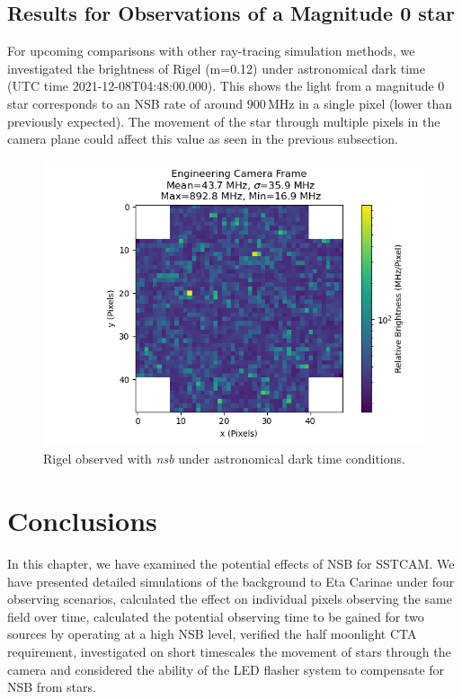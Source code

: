 \subsection{Results for Observations of a Magnitude 0 star}
For upcoming comparisons with other ray-tracing simulation methods, we investigated the brightness of Rigel (m=0.12) under astronomical dark time (UTC time 2021-12-08T04:48:00.000). This shows the light from a magnitude 0 star corresponds to an NSB rate of around $\mathrm{900\,MHz}$ in a single pixel (lower than previously expected). The movement of the star through multiple pixels in the camera plane could affect this value as seen in the previous subsection.
\begin{figure}[t!]
\begin{centering}
\includegraphics[width=0.7\columnwidth]{./figures/Hz_pixel_Rigel.png}
\caption{Rigel observed with \textit{nsb} under astronomical dark time conditions.}
\label{fig:rigel}
\end{centering}
\end{figure}
\section{Conclusions}

In this chapter, we have examined the potential effects of NSB for SSTCAM. We have presented detailed simulations of the background to Eta Carinae under four observing scenarios, calculated the effect on individual pixels observing the same field over time, calculated the potential observing time to be gained for two sources by operating at a high NSB level, verified the half moonlight CTA requirement, investigated on short timescales the movement of stars through the camera and considered the ability of the LED flasher system to compensate for NSB from stars.


